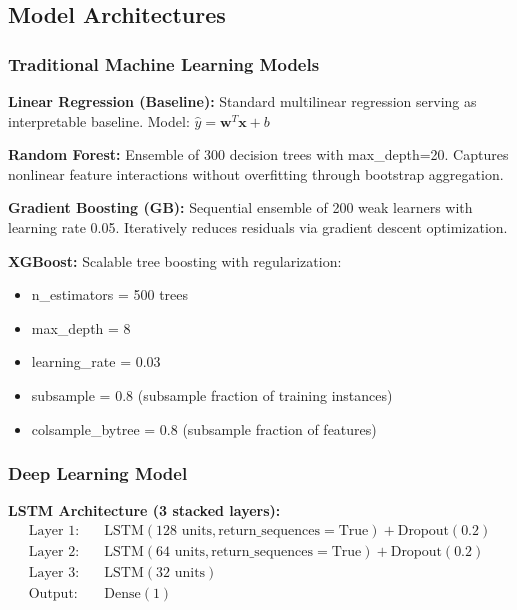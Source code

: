 \documentclass[11pt, a4paper, oneside]{article}
\begin{document}
\subsection{Model Architectures}

\subsubsection{Traditional Machine Learning Models}

\textbf{Linear Regression (Baseline):}
Standard multilinear regression serving as interpretable baseline. Model: $\hat{y} = \mathbf{w}^T \mathbf{x} + b$

\textbf{Random Forest:}
Ensemble of 300 decision trees with max\_depth=20. Captures nonlinear feature interactions without overfitting through bootstrap aggregation.

\textbf{Gradient Boosting (GB):}
Sequential ensemble of 200 weak learners with learning rate 0.05. Iteratively reduces residuals via gradient descent optimization.

\textbf{XGBoost:}
Scalable tree boosting with regularization:
\begin{itemize}
    \item n\_estimators = 500 trees
    \item max\_depth = 8
    \item learning\_rate = 0.03
    \item subsample = 0.8 (subsample fraction of training instances)
    \item colsample\_bytree = 0.8 (subsample fraction of features)
\end{itemize}

\subsubsection{Deep Learning Model}

\textbf{LSTM Architecture (3 stacked layers):}
\begin{align}
\text{Layer 1:} & \quad \text{LSTM}(128 \text{ units}, \text{return\_sequences}=\text{True}) + \text{Dropout}(0.2) \\
\text{Layer 2:} & \quad \text{LSTM}(64 \text{ units}, \text{return\_sequences}=\text{True}) + \text{Dropout}(0.2) \\
\text{Layer 3:} & \quad \text{LSTM}(32 \text{ units}) \\
\text{Output:} & \quad \text{Dense}(1)
\end{align}
\end{document}
